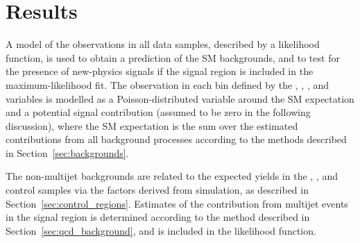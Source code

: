 \section{Results}
\label{sec:result}

A model of the observations in all data samples, described by a
likelihood function, is used to obtain a prediction of the SM
backgrounds, and to test for the presence of new-physics signals if
the signal region is included in the maximum-likelihood fit. The
observation in each bin defined by the \njet, \nb, \scalht, and
\HTmiss variables is modelled as a Poisson-distributed variable around
the SM expectation and a potential signal contribution (assumed to be
zero in the following discussion), where the SM expectation is the sum
over the estimated contributions from all background processes
according to the methods described in Section~\ref{sec:backgrounds}.

The non-multijet backgrounds 
are related to the expected yields in the \mj, \mmj, and \gj control
samples via the \tf factors derived from simulation, as described in
Section~\ref{sec:control_regions}.
Estimates of the contribution from multijet events in the signal
region is determined according to the method described in
Section~\ref{sec:qcd_background}, and is included in the likelihood
function.


